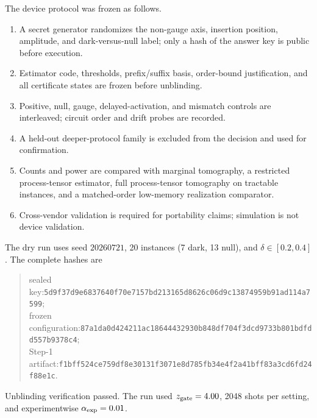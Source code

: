 \documentclass[aps,prl,reprint,superscriptaddress,nofootinbib]{revtex4-2}
\newcommand{\hashfour}[4]{\texttt{#1}\allowbreak\texttt{#2}\allowbreak\texttt{#3}\allowbreak\texttt{#4}}
\begin{document}
The device protocol was frozen as follows.
\begin{enumerate}
\item A secret generator randomizes the non-gauge axis, insertion position, amplitude, and dark-versus-null label; only a hash of the answer key is public before execution.
\item Estimator code, thresholds, prefix/suffix basis, order-bound justification, and all certificate states are frozen before unblinding.
\item Positive, null, gauge, delayed-activation, and mismatch controls are interleaved; circuit order and drift probes are recorded.
\item A held-out deeper-protocol family is excluded from the decision and used for confirmation.
\item Counts and power are compared with marginal tomography, a restricted process-tensor estimator, full process-tensor tomography on tractable instances, and a matched-order low-memory realization comparator.
\item Cross-vendor validation is required for portability claims; simulation is not device validation.
\end{enumerate}

The dry run uses seed $20260721$, 20 instances (7 dark, 13 null), and $\delta\in[0.2,0.4]$.  The complete hashes are
\begin{quote}\small\raggedright
sealed key:\quad \hashfour{5d9f37d9e6837640}{f70e7157bd213165}{d8626c06d9c13874}{959b91ad114a7599};\\
frozen configuration:\quad \hashfour{87a1da0d424211ac}{18644432930b848d}{f704f3dcd9733b80}{1bdfdd557b9378c4};\\
Step-1 artifact:\quad \hashfour{f1bff524ce759df8}{e30131f3071e8d78}{5fb34e4f2a41bff8}{3a3cd6fd24f88e1c}.
\end{quote}
Unblinding verification passed.  The run used $z_{\rm gate}=4.00$, 2048 shots per setting, and experimentwise $\alpha_{\rm exp}=0.01$.
\end{document}
